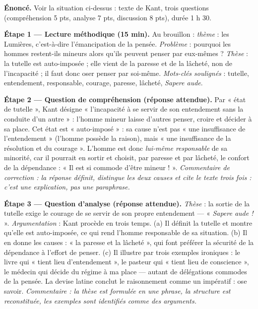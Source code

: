 \documentclass[11pt]{article}
\begin{document}
\begin{exoresolu}
\textbf{Énoncé.} Voir la situation ci-dessus : texte de Kant, trois questions (compréhension 5 pts, analyse 7 pts, discussion 8 pts), durée 1 h 30.

\tcblower

\textbf{Étape 1 — Lecture méthodique (15 min).} Au brouillon : \emph{thème} : les Lumières, c'est-à-dire l'émancipation de la pensée. \emph{Problème} : pourquoi les hommes restent-ils mineurs alors qu'ils peuvent penser par eux-mêmes ? \emph{Thèse} : la tutelle est auto-imposée ; elle vient de la paresse et de la lâcheté, non de l'incapacité ; il faut donc oser penser par soi-même. \emph{Mots-clés soulignés} : tutelle, entendement, responsable, courage, paresse, lâcheté, \emph{Sapere aude}.

\textbf{Étape 2 — Question de compréhension (réponse attendue).} Par « état de tutelle », Kant désigne « l'incapacité à se servir de son entendement sans la conduite d'un autre » : l'homme mineur laisse d'autres penser, croire et décider à sa place. Cet état est « auto-imposé » : sa cause n'est pas « une insuffisance de l'entendement » (l'homme possède la raison), mais « une insuffisance de la résolution et du courage ». L'homme est donc \emph{lui-même responsable} de sa minorité, car il pourrait en sortir et choisit, par paresse et par lâcheté, le confort de la dépendance : « Il est si commode d'être mineur ! ». \emph{Commentaire de correction : la réponse définit, distingue les deux causes et cite le texte trois fois : c'est une explication, pas une paraphrase.}

\textbf{Étape 3 — Question d'analyse (réponse attendue).} \emph{Thèse} : la sortie de la tutelle exige le courage de se servir de son propre entendement — « \emph{Sapere aude !} ». \emph{Argumentation} : Kant procède en trois temps. (a) Il définit la tutelle et montre qu'elle est auto-imposée, ce qui rend l'homme responsable de sa situation. (b) Il en donne les causes : « la paresse et la lâcheté », qui font préférer la sécurité de la dépendance à l'effort de penser. (c) Il illustre par trois exemples ironiques : le livre qui « tient lieu d'entendement », le pasteur qui « tient lieu de conscience », le médecin qui décide du régime à ma place — autant de délégations commodes de la pensée. La devise latine conclut le raisonnement comme un impératif : ose savoir. \emph{Commentaire : la thèse est formulée en une phrase, la structure est reconstituée, les exemples sont identifiés comme des arguments.}


\end{exoresolu}
\end{document}
